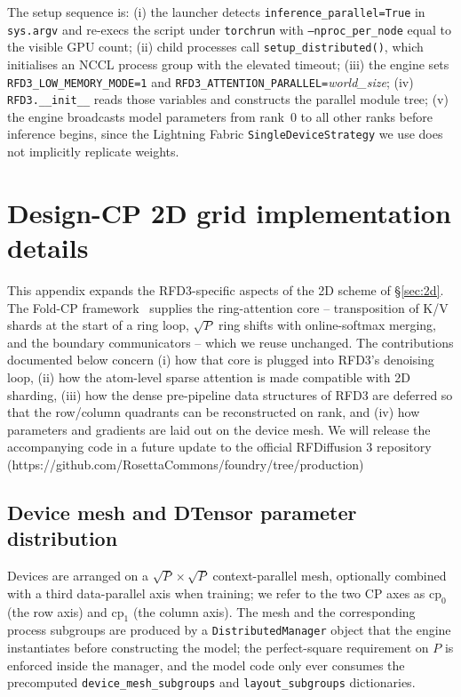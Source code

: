 \documentclass{article}
\theoremstyle{plain}
\theoremstyle{definition}
\theoremstyle{remark}
\begin{document}
The setup sequence is: (i) the launcher detects \texttt{inference\_parallel=True} in \texttt{sys.argv} and re-execs the script under \texttt{torchrun} with \texttt{--nproc\_per\_node} equal to the visible GPU count; (ii) child processes call \texttt{setup\_distributed()}, which initialises an NCCL process group with the elevated timeout; (iii) the engine sets \texttt{RFD3\_LOW\_MEMORY\_MODE=1} and \texttt{RFD3\_ATTENTION\_PARALLEL=}\textit{world\_size}; (iv) \texttt{RFD3.\_\_init\_\_} reads those variables and constructs the parallel module tree; (v) the engine broadcasts model parameters from rank~$0$ to all other ranks before inference begins, since the Lightning Fabric \texttt{SingleDeviceStrategy} we use does not implicitly replicate weights.

\section{Design-CP 2D grid implementation details}
\label{app:cp2d-impl}

This appendix expands the RFD3-specific aspects of the 2D scheme of \S\ref{sec:2d}. The Fold-CP framework~\cite{lin_fold-cp_2026} supplies the ring-attention core -- transposition of K/V shards at the start of a ring loop, $\sqrt{P}$ ring shifts with online-softmax merging, and the boundary communicators -- which we reuse unchanged. The contributions documented below concern (i) how that core is plugged into RFD3's denoising loop, (ii) how the atom-level sparse attention is made compatible with 2D sharding, (iii) how the dense pre-pipeline data structures of RFD3 are deferred so that the row/column quadrants can be reconstructed on rank, and (iv) how parameters and gradients are laid out on the device mesh. We will release the accompanying code in a future update to the official RFDiffusion 3 repository (https://github.com/RosettaCommons/foundry/tree/production)

\subsection{Device mesh and DTensor parameter distribution}
\label{app:2d-mesh}

Devices are arranged on a $\sqrt{P}\times\sqrt{P}$ context-parallel mesh, optionally combined with a third data-parallel axis when training; we refer to the two CP axes as $\text{cp}_0$ (the row axis) and $\text{cp}_1$ (the column axis). The mesh and the corresponding process subgroups are produced by a \texttt{DistributedManager} object that the engine instantiates before constructing the model; the perfect-square requirement on $P$ is enforced inside the manager, and the model code only ever consumes the precomputed \texttt{device\_mesh\_subgroups} and \texttt{layout\_subgroups} dictionaries.
\end{document}
